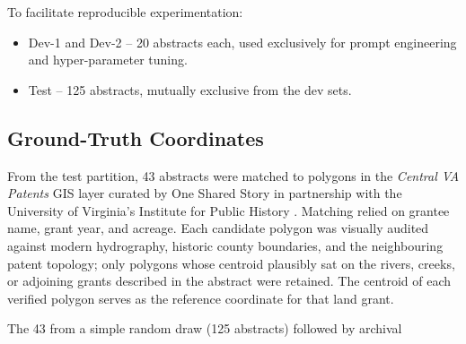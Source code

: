 To facilitate reproducible experimentation\DIFdelbegin {}\DIFdelend \DIFaddbegin {}\DIFaddend :

\begin{itemize}
\tightlist
\item
  Dev-1 and Dev-2 -- 20 abstracts each, used exclusively for prompt
  engineering and hyper-parameter tuning.
\item
  Test -- 125 abstracts, mutually exclusive from the dev sets.
\end{itemize}

\subsection{Ground-Truth
Coordinates}\label{ground-truth-coordinates}

From the \DIFdelbegin {}\DIFdelend \DIFaddbegin {}\DIFaddend test partition, 43 abstracts were matched to polygons
in the \emph{Central VA Patents} GIS layer curated by One Shared Story
in partnership with the University of Virginia's Institute for Public
History \citep{central_va_patents_gis}. Matching relied on grantee name,
grant year, and acreage. Each candidate polygon was visually audited
against modern hydrography, historic county boundaries, and the
neighbouring patent topology; only polygons whose centroid plausibly sat
on the rivers, creeks, or adjoining grants described in the abstract
were retained. The centroid of each verified polygon serves as the
reference coordinate for that land grant.

The 43 \DIFdelbegin {}\DIFdelend \DIFaddbegin {}\DIFaddend from a simple random draw (125 abstracts) followed by
archival \DIFdelbegin {}\DIFdelend \DIFaddbegin {}\DIFaddend 

